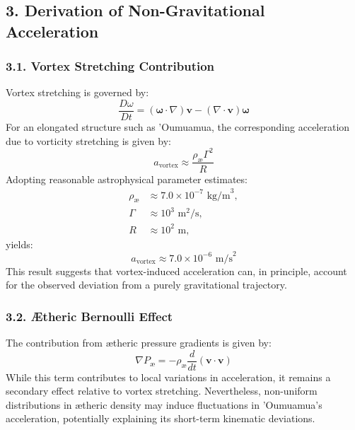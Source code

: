 \documentclass[a4paper,10pt]{article}
\begin{document}
    \subsection*{3. Derivation of Non-Gravitational Acceleration}

    \subsubsection*{3.1. Vortex Stretching Contribution}
    Vortex stretching is governed by:
    \begin{equation*}
        \frac{D\omega}{Dt} = (\mathbf{\omega} \cdot \nabla) \mathbf{v} - (\nabla \cdot \mathbf{v}) \mathbf{\omega}
    \end{equation*}
    For an elongated structure such as 'Oumuamua, the corresponding acceleration due to vorticity stretching is given by:
    \begin{equation*}
        a_\text{vortex} \approx \frac{\rho_\text{\ae} \Gamma^2}{R}
    \end{equation*}
    Adopting reasonable astrophysical parameter estimates:
    \begin{align*}
        \rho_\text{\ae} &\approx 7.0 \times 10^{-7} \text{ kg/m}^3,\\
        \Gamma &\approx 10^3 \text{ m}^2/\text{s},\\
        R &\approx 10^2 \text{ m},
    \end{align*}
    yields:
    \begin{equation*}
        a_\text{vortex} \approx 7.0 \times 10^{-6} \text{ m/s}^2
    \end{equation*}
    This result suggests that vortex-induced acceleration can, in principle, account for the observed deviation from a purely gravitational trajectory.

    \subsubsection*{3.2. Ætheric Bernoulli Effect}
    The contribution from ætheric pressure gradients is given by:
    \begin{equation*}
        \nabla P_\text{\ae} = -\rho_\text{\ae} \frac{d}{dt} (\mathbf{v} \cdot \mathbf{v})
    \end{equation*}
    While this term contributes to local variations in acceleration, it remains a secondary effect relative to vortex stretching. Nevertheless, non-uniform distributions in ætheric density may induce fluctuations in 'Oumuamua's acceleration, potentially explaining its short-term kinematic deviations.
\end{document}
